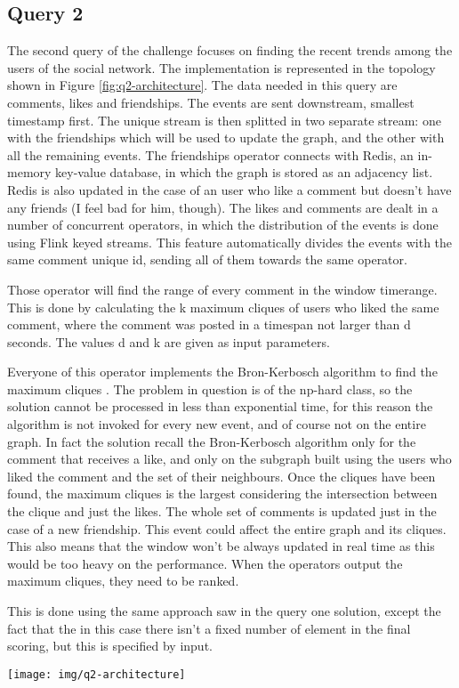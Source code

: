 \subsection{Query 2}
The second query of the challenge focuses on finding the recent trends among the users of the social network. The implementation is represented in the topology shown in Figure \ref{fig:q2-architecture}. The data needed in this query are comments, likes and friendships. The events are sent downstream, smallest timestamp first. The unique stream is then splitted in two separate stream: one with the friendships which will be used to update the graph, and the other with all the remaining events. The friendships operator connects with Redis, an in-memory key-value database, in which the graph is stored as an adjacency list. Redis is also updated in the case of an user who like a comment but doesn’t have any friends (I feel bad for him, though). The likes and comments are dealt in a number of concurrent operators, in which the distribution of the events is done using Flink keyed streams. This feature automatically divides the events with the same comment unique id, sending all of them towards the same operator.

Those operator will find the range of every comment in the window timerange. This is done by calculating the k maximum cliques of users who liked the same comment, where the comment was posted in a timespan not larger than d seconds. The values d and k are given as input parameters.

Everyone of this operator implements the Bron-Kerbosch algorithm to find the maximum cliques \cite{BronKerbosch1973}. The problem in question is of the np-hard class, so the solution cannot be processed in less than exponential time, for this reason the algorithm is not invoked for every new event, and of course not on the entire graph. In fact the solution recall the Bron-Kerbosch algorithm only for the comment that receives a like, and only on the subgraph built using the users who liked the comment and the set of their neighbours. Once the cliques have been found, the maximum cliques is the largest considering the intersection between the clique and just the likes. The whole set of comments is updated just
in the case of a new friendship. This event could affect the entire graph and its cliques. This also means that the window won’t be always updated in real time as this would be too heavy on the performance. When the operators output the maximum cliques, they need to be ranked. 

This is done using the same approach saw in the query one solution, except the fact that the in this case there isn’t a fixed number 
of element in the final scoring, but this is specified by input.

\begin{figure*}[t]
	\centering
	\texttt{[image: img/q2-architecture]}
	\caption{Query 2: the topology of operators.}
	\label{fig:q2-architecture}
\end{figure*}